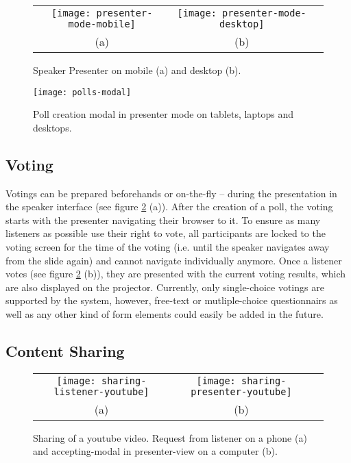 \begin{figure}
\centering
\begin{tabular}{ccc}
\texttt{[image: presenter-mode-mobile]} &
\texttt{[image: presenter-mode-desktop]} \\
(a) & (b)
\end{tabular}
\caption{Speaker Presenter on mobile (a) and desktop (b).}
\label{fig:results-user-speaker-presenter}
\end{figure}

\begin{figure}
\centering
\texttt{[image: polls-modal]}
\caption{Poll creation modal in presenter mode on tablets, laptops and desktops.}
\label{fig:results-user-polls-modal}
\end{figure}

\subsection{Voting}
Votings can be prepared beforehands or on-the-fly -- during the presentation in the speaker interface (see figure \ref{fig:results-user-polls-modal} (a)). After the creation of a poll, the voting starts with the presenter navigating their browser to it.
To ensure as many listeners as possible use their right to vote, all participants are locked to the voting screen for the time of the voting (i.e. until the speaker navigates away from the slide again) and cannot navigate individually anymore. Once a listener votes (see figure \ref{fig:results-user-polls-modal} (b)), they are presented with the current voting results, which are also displayed on the projector. Currently, only single-choice votings are supported by the system, however, free-text or mutliple-choice questionnairs as well as any other kind of form elements could easily be added in the future.

\subsection{Content Sharing}

\begin{figure}
\centering
\begin{tabular}{ccc}
\texttt{[image: sharing-listener-youtube]} &
\texttt{[image: sharing-presenter-youtube]} \\
(a) & (b)
\end{tabular}
\caption{Sharing of a youtube video. Request from listener on a phone (a) and accepting-modal in presenter-view on a computer (b).}
\label{fig:results-user-sharing-youtube}
\end{figure}

